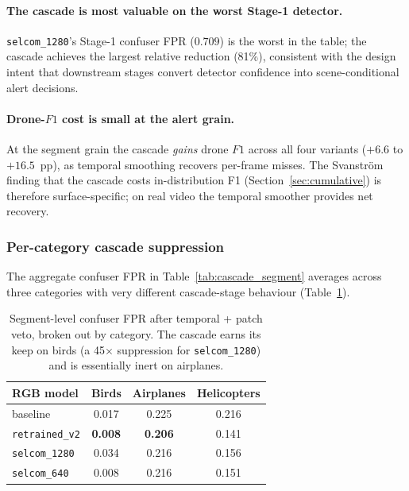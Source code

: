 \paragraph{The cascade is most valuable on the worst Stage-1 detector.}
\texttt{selcom\_1280}'s Stage-1 confuser FPR ($0.709$) is the worst in the table; the cascade achieves the largest relative reduction (81\%), consistent with the design intent that downstream stages convert detector confidence into scene-conditional alert decisions.

\paragraph{Drone-$F1$ cost is small at the alert grain.}
At the segment grain the cascade \emph{gains} drone $F1$ across all four variants ($+6.6$ to $+16.5$~pp), as temporal smoothing recovers per-frame misses. The Svanstr\"om finding that the cascade costs in-distribution F1 (Section~\ref{sec:cumulative}) is therefore surface-specific; on real video the temporal smoother provides net recovery.

\subsubsection{Per-category cascade suppression}
\label{sec:realvideo_percategory}

The aggregate confuser FPR in Table~\ref{tab:cascade_segment} averages across three categories with very different cascade-stage behaviour (Table~\ref{tab:cascade_percategory}).

\begin{table}[htbp]
    \centering
    \caption{Segment-level confuser FPR after temporal + patch veto, broken out by category. The cascade earns its keep on birds (a 45$\times$ suppression for \texttt{selcom\_1280}) and is essentially inert on airplanes.}
    \label{tab:cascade_percategory}
    \begin{tabular}{lccc}
        \toprule
        RGB model & Birds & Airplanes & Helicopters \\
        \midrule
        baseline           & 0.017 & 0.225 & 0.216 \\
        \texttt{retrained\_v2} & \textbf{0.008} & \textbf{0.206} & 0.141 \\
        \texttt{selcom\_1280}  & 0.034 & 0.216 & 0.156 \\
        \texttt{selcom\_640}   & 0.008 & 0.216 & 0.151 \\
        \bottomrule
    \end{tabular}
\end{table}

